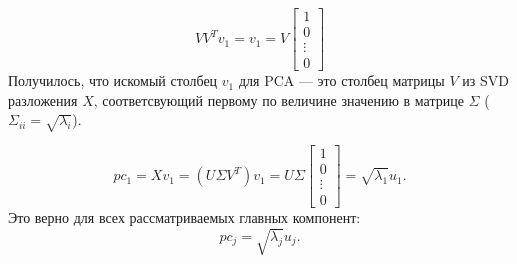 \documentclass[12pt]{article} %
\theoremstyle{definition} %
\begin{document}
\[VV^Tv_1 = v_1 = V
\begin{bmatrix}
1\\
0\\
\vdots\\
0
\end{bmatrix}\]
Получилось, что искомый столбец \(v_1\) для PCA  —  это столбец матрицы \(V\) из SVD разложения \(X\), соответсвующий первому по величине значению в матрице \( \Sigma\) (\(\Sigma_{ii} = \sqrt{\lambda_i}\)).

\[
pc_1 = Xv_1 = (U\Sigma V^T)v_1 =
U \Sigma
\begin{bmatrix}
1\\
0\\
\vdots\\
0
\end{bmatrix}=
\sqrt{\lambda_1}u_1.
\]
Это верно для всех рассматриваемых главных компонент:
\[pc_j = \sqrt{\lambda_j} u_j.\]
\end{document}
